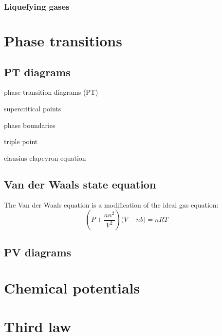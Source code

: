 \documentclass{article}
\begin{document}
\subsubsection{Liquefying gases}

\newpage

\section{Phase transitions}

\subsection{PT diagrams}
phase transition diagrams (PT)

supercritical points

phase boundaries

triple point

clausius clapeyron equation

\newpage

\subsection{Van der Waals state equation}
The Van der Waals equation is a modification of the 
ideal gas equation:
$$\left(P+\frac{an^2}{V^2}\right)
\bigl(V-nb\bigr)=nRT$$


\newpage

\subsection{PV diagrams}

\newpage

\section{Chemical potentials}

\newpage

\section{Third law}
\end{document}
